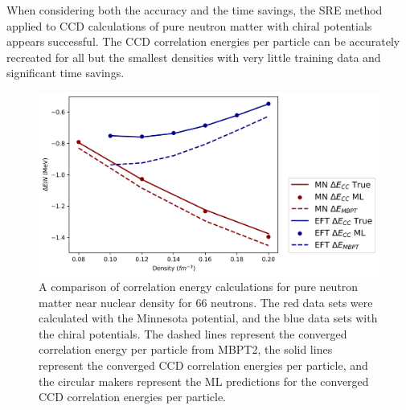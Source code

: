 When considering both the accuracy and the time savings, the SRE method applied to CCD calculations of pure neutron matter with chiral potentials appears successful. The CCD correlation energies per particle can be accurately recreated for all but the smallest densities with very little training data and significant time savings.


\begin{figure}
    \centering
    \includegraphics[scale=0.75]{Images/Chapter7/ORNL/EFT_and_MN.png}
    \caption{A comparison of correlation energy calculations for pure neutron matter near nuclear density for 66 neutrons.  The red data sets were calculated with the Minnesota potential, and the blue data sets with the chiral potentials. The dashed lines represent the converged correlation energy per particle from MBPT2, the solid lines represent the converged CCD correlation energies per particle, and the circular makers represent the ML predictions for the converged CCD correlation energies per particle.}
    \label{fig:eft_vs_mn}
\end{figure}

